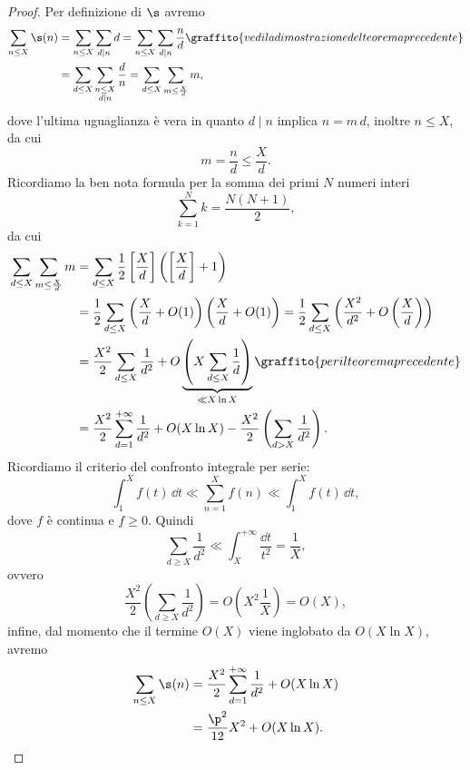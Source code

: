 \begin{proof}
	Per definizione di \(\s\) avremo
	\[
		\begin{split}
			\sum_{n\le X}\s(n) & =\sum_{n\le X}\sum_{d\mid n}d = \sum_{n\le X}\sum_{d\mid n}\frac{n}{d}\graffito{vedi la dimostrazione del teorema precedente}\\
			& =\sum_{d\le X}\sum_{\substack{n\le X\\d\mid n}}\frac{d}{n} = \sum_{d\le X}\sum_{m\le \frac{X}{d}}m,
		\end{split}
	\]
	dove l'ultima uguaglianza è vera in quanto \(d\mid n\) implica \(n=m\,d\), inoltre \(n\le X\), da cui
	\[
		m=\frac{n}{d}\le \frac{X}{d}.
	\]
	Ricordiamo la ben nota formula per la somma dei primi \(N\) numeri interi
	\[
		\sum_{k=1}^N k=\frac{N(N+1)}{2},
	\]
	da cui
	\[
		\begin{split}
			\sum_{d\le X}\sum_{m\le\frac{X}{d}}m & =\sum_{d\le X}\frac{1}{2}\left[\frac{X}{d}\right]\left(\left[\frac{X}{d}\right]+1\right)\\
			& =\frac{1}{2}\sum_{d\le X}\left(\frac{X}{d}+O(1)\right)\left(\frac{X}{d}+O(1)\right)=\frac{1}{2}\sum_{d\le X}\left(\frac{X^2}{d^2}+O\left(\frac{X}{d}\right)\right)\\
			& =\frac{X^2}{2}\sum_{d\le X}\frac{1}{d^2}+O\underbrace{\left(X\sum_{d\le X}\frac{1}{d}\right)}_{\ll X\ln X}\graffito{per il teorema precedente}\\
			& =\frac{X^2}{2}\sum_{d=1}^{+\infty}\frac{1}{d^2}+O(X\ln X)-\frac{X^2}{2}\left(\sum_{d>X}\frac{1}{d^2}\right).
		\end{split}
	\]
	Ricordiamo il criterio del confronto integrale per serie:
	\[
		\int_1^X f(t)\,\dd t\ll \sum_{n=1}^X f(n) \ll \int_1^X f(t)\,\dd t,
	\]
	dove \(f\) è continua e \(f\ge 0\).
	Quindi
	\[
		\sum_{d\ge X}\frac{1}{d^2}\ll \int_X^{+\infty}\frac{\dd t}{t^2}=\frac{1}{X},
	\]
	ovvero
	\[
		\frac{X^2}{2}\left(\sum_{d\ge X}\frac{1}{d^2}\right)=O\left(X^2\frac{1}{X}\right)=O(X),
	\]
	infine, dal momento che il termine \(O(X)\) viene inglobato da \(O(X\ln X)\), avremo
	\[
		\begin{split}
			\sum_{n\le X}\s(n) & =\frac{X^2}{2}\sum_{d=1}^{+\infty}\frac{1}{d^2}+O(X\ln X)\\
			& =\frac{\p^2}{12}X^2+O(X\ln X).\qedhere
		\end{split}
	\]
\end{proof}
%
%
